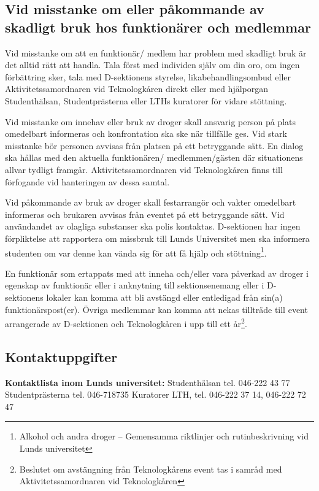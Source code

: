 \documentclass[]{dsekprotokoll}
\begin{document}
\subsection{Vid misstanke om eller påkommande av skadligt bruk hos funktionärer och medlemmar}

Vid misstanke om att en funktionär/ medlem har problem med skadligt bruk är det alltid rätt att handla. Tala först med individen själv om din oro, om ingen förbättring sker, tala med D-sektionens styrelse, likabehandlingsombud eller Aktivitetssamordnaren vid Teknologkåren direkt eller med hjälporgan Studenthälsan, Studentprästerna eller LTHs kuratorer för vidare stöttning.

Vid misstanke om innehav eller bruk av droger skall ansvarig person på plats omedelbart informeras och konfrontation ska ske när tillfälle ges. Vid stark misstanke bör personen avvisas från platsen på ett betryggande sätt. En dialog ska hållas med den aktuella funktionären/ medlemmen/gästen där situationens allvar tydligt framgår. Aktivitetssamordnaren vid Teknologkåren finns till förfogande vid hanteringen av dessa samtal.

Vid påkommande av bruk av droger skall festarrangör och vakter omedelbart informeras och brukaren avvisas från eventet på ett betryggande sätt. Vid användandet av olagliga substanser ska polis kontaktas. D-sektionen har ingen förpliktelse att rapportera om missbruk till Lunds Universitet men ska informera studenten om var denne kan vända sig för att få hjälp och stöttning\footnote{Alkohol och andra droger – Gemensamma riktlinjer och rutinbeskrivning vid Lunds universitet}.

En funktionär som ertappats med att inneha och/eller vara påverkad av droger i egenskap av funktionär eller i anknytning till sektionsenemang eller i D-sektionens lokaler kan komma att bli avstängd eller entledigad från sin(a) funktionärspost(er). Övriga medlemmar kan komma att nekas tillträde till event arrangerade av D-sektionen och Teknologkåren i upp till ett år\footnote{Beslutet om avstängning från Teknologkårens event  tas i samråd med Aktivitetssamordnaren vid Teknologkåren}.

\subsection{Kontaktuppgifter}
\textbf{Kontaktlista inom Lunds universitet:}\newline
Studenthälsan tel. 046-222 43 77 \newline
Studentprästerna tel. 046-718735\newline
Kuratorer LTH, tel. 046-222 37 14, 046-222 72 47
\end{document}
